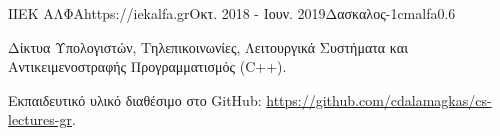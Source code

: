 \documentclass{mycv}
\begin{document}


		
	\begin{EntryDatedLogo}{ΙΙΕΚ ΑΛΦΑ}{https://iekalfa.gr}{Οκτ. 2018 - Ιουν. 2019}{Δασκαλος}{-1cm}{alfa}{0.6}
		\begin{Itemize}
			\item Δίκτυα Υπολογιστών, Τηλεπικοινωνίες, Λειτουργικά Συστήματα και Αντικειμενοστραφής Προγραμματισμός (C++).
			\item Εκπαιδευτικό υλικό διαθέσιμο στο GitHub: \url{https://github.com/cdalamagkas/cs-lectures-gr}.
		\end{Itemize}
	\end{EntryDatedLogo}

	
\end{document}
